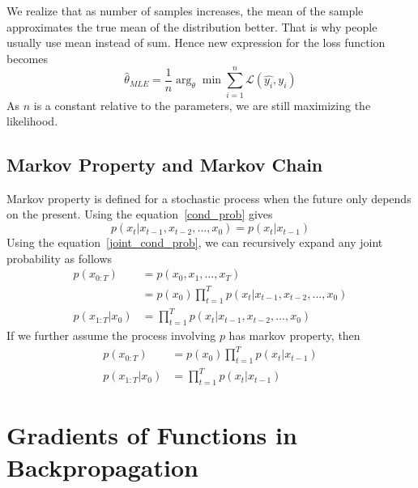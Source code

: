 \documentclass{article}
\numberwithin{equation}{subsection}
\begin{document}
We realize that as number of samples increases, the mean of the sample approximates the true mean of the distribution better. That is why people usually use mean instead of sum. Hence new expression for the loss function becomes 
\begin{equation}
    \hat{\theta}_{MLE} = \frac{1}{n}\arg_\theta \min \sum_{i=1}^n \mathcal{L}(\hat{y_i},y_i)
\end{equation}
As $n$ is a constant relative to the parameters, we are still maximizing the likelihood.
\subsection{Markov Property and Markov Chain}
Markov property is defined for a stochastic process when the future only depends on the present. Using the equation~\ref{cond_prob} gives
\begin{equation}
    p(x_t|x_{t-1},x_{t-2},...,x_0) = p(x_t|x_{t-1})
\end{equation}
Using the equation~\ref{joint_cond_prob}, we can recursively expand any joint probability as follows
\begin{align}
    p(x_{0:T}) &= p(x_0,x_1,...,x_T) \\
    &= p(x_0)\prod_{t=1}^T p(x_t|x_{t-1},x_{t-2},...,x_0)\\
    p(x_{1:T}|x_0) &= \prod_{t=1}^T p(x_t|x_{t-1},x_{t-2},...,x_0)
\end{align}
If we further assume the process involving $p$ has markov property, then
\begin{align}
    p(x_{0:T}) &= p(x_0)\prod_{t=1}^T p(x_t|x_{t-1}) \label{markov_chain_joint}\\
    p(x_{1:T}|x_0) &= \prod_{t=1}^T p(x_t|x_{t-1}) \label{markov_chain_cond}
\end{align}
\section{Gradients of Functions in Backpropagation}
\end{document}
